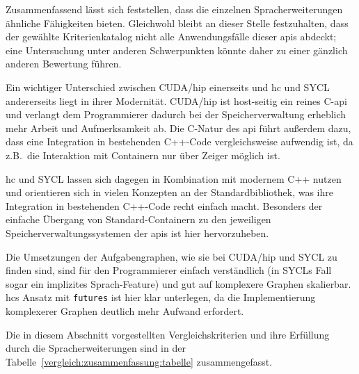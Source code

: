 Zusammenfassend lässt sich feststellen, dass die einzelnen Spracherweiterungen
ähnliche Fähigkeiten bieten. Gleichwohl bleibt an dieser Stelle festzuhalten,
dass der gewählte Kriterienkatalog nicht alle Anwendungsfälle dieser \gls{api}s
abdeckt; eine Untersuchung unter anderen Schwerpunkten könnte daher zu einer
gänzlich anderen Bewertung führen.

Ein wichtiger Unterschied zwischen CUDA/\gls{hip} einerseits und \gls{hc} und
SYCL andererseits liegt in ihrer Modernität. CUDA/\gls{hip} ist host-seitig ein
reines C-\gls{api} und verlangt dem Programmierer dadurch bei der
Speicherverwaltung erheblich mehr Arbeit und Aufmerksamkeit ab. Die C-Natur des
\gls{api} führt außerdem dazu, dass eine Integration in bestehenden C++-Code
vergleichsweise aufwendig ist, da z.B.\ die Interaktion mit Containern nur
über Zeiger möglich ist.

\gls{hc} und SYCL lassen sich dagegen in Kombination mit modernem C++ nutzen und
orientieren sich in vielen Konzepten an der Standardbibliothek, was ihre
Integration in bestehenden C++-Code recht einfach macht. Besonders der einfache
Übergang von Standard-Containern zu den jeweiligen Speicherverwaltungssystemen
der \gls{api}s ist hier hervorzuheben.

Die Umsetzungen der Aufgabengraphen, wie sie bei CUDA/\gls{hip} und SYCL zu
finden sind, sind für den Programmierer einfach verständlich (in SYCLs Fall
sogar ein implizites Sprach-Feature) und gut auf komplexere Graphen skalierbar.
\gls{hc}s Ansatz mit \texttt{futures} ist hier klar unterlegen, da die
Implementierung komplexerer Graphen deutlich mehr Aufwand erfordert.

Die in diesem Abschnitt vorgestellten Vergleichskriterien und ihre Erfüllung
durch die Spracherweiterungen sind in der
Tabelle~\ref{vergleich:zusammenfassung:tabelle} zusammengefasst.

